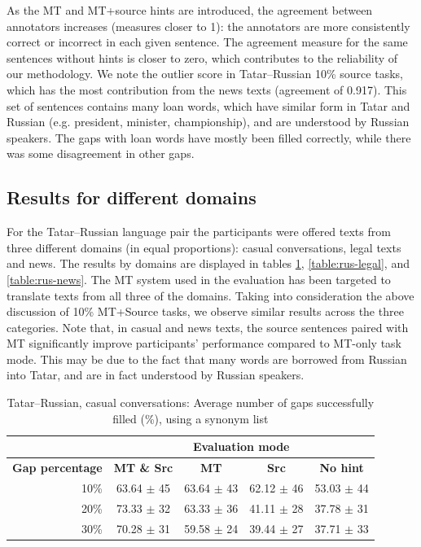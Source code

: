 \documentclass[11pt]{article}
\begin{document}
As the MT and MT+source hints are introduced, the agreement between annotators increases (measures closer to 1): the annotators are more consistently correct or incorrect in each given sentence. The agreement measure for the same sentences without hints is closer to zero, which contributes to the reliability of our methodology. We note the outlier score in Tatar--Russian 10\% source tasks, which has the most contribution from the news texts (agreement of 0.917). This set of sentences contains many loan words, which have similar form in Tatar and Russian (e.g. president, minister, championship), and are understood by Russian speakers. The gaps with loan words have mostly been filled correctly, while there was some disagreement in other gaps.



\subsection{Results for different domains}
For the Tatar--Russian language pair the participants were offered texts from three different domains (in equal proportions): casual conversations, legal texts and news. The results by domains are displayed in tables \ref{table:rus-casual}, \ref{table:rus-legal}, and \ref{table:rus-news}. The MT system used in the evaluation has been targeted to translate texts from all three of the domains. Taking into consideration the above discussion of 10\% MT+Source tasks, we observe similar results across the three categories. Note that, in casual and news texts, the source sentences paired with MT significantly improve participants' performance compared to MT-only task mode. This may be due to the fact that many words are borrowed from Russian into Tatar, and are in fact understood by Russian speakers.




\begin{table}

\centering
\begin{tabular}{|r |*{4}{c}|}
\hline
  &\multicolumn{4}{c|}{\textbf{Evaluation mode}}\\
\hline
\textbf{Gap percentage} & \textbf{MT \& Src} & \textbf{MT} & \textbf{Src} & \textbf{No hint} \\
\hline
10\%&63.64 \(\pm\) 45&63.64 \(\pm\) 43&62.12 \(\pm\) 46&53.03 \(\pm\) 44\\
20\%&73.33 \(\pm\) 32&63.33 \(\pm\) 36&41.11 \(\pm\) 28&37.78 \(\pm\) 31\\
30\%&70.28 \(\pm\) 31&59.58 \(\pm\) 24&39.44 \(\pm\) 27&37.71 \(\pm\) 33\\
\hline
\end{tabular}
\caption {Tatar--Russian, casual conversations: Average number of gaps successfully filled (\%), using a synonym list} 
\label{table:rus-casual} 
\end{table}
\end{document}
